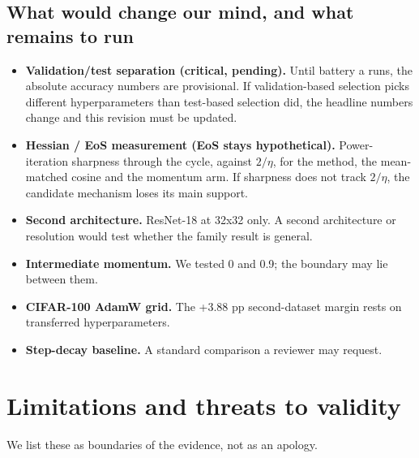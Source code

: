 \documentclass[11pt,a4paper]{article}
\begin{document}
\subsection{What would change our mind, and what remains to run}
\begin{itemize}
\item \textbf{Validation/test separation (critical, pending).} Until battery a runs, the absolute accuracy numbers are provisional. If validation-based selection picks different hyperparameters than test-based selection did, the headline numbers change and this revision must be updated.
\item \textbf{Hessian / EoS measurement (EoS stays hypothetical).} Power-iteration sharpness through the cycle, against $2/\eta$, for the method, the mean-matched cosine and the momentum arm. If sharpness does not track $2/\eta$, the candidate mechanism loses its main support.
\item \textbf{Second architecture.} ResNet-18 at 32x32 only. A second architecture or resolution would test whether the family result is general.
\item \textbf{Intermediate momentum.} We tested 0 and 0.9; the boundary may lie between them.
\item \textbf{CIFAR-100 AdamW grid.} The +3.88 pp second-dataset margin rests on transferred hyperparameters.
\item \textbf{Step-decay baseline.} A standard comparison a reviewer may request.
\end{itemize}

\section{Limitations and threats to validity}
We list these as boundaries of the evidence, not as an apology.
\end{document}
